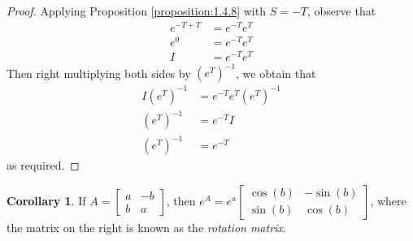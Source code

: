 \documentclass[11pt]{book}
\theoremstyle{definition}\newtheorem{definition}[subsection]{Definition}
\theoremstyle{definition}\newtheorem{example}[subsection]{Example}
\theoremstyle{definition}\newtheorem{notation}[subsection]{Notation}
\theoremstyle{definition}\newtheorem{remark}[subsection]{Remark}
\theoremstyle{theorem}\newtheorem{theorem}[subsection]{Theorem}
\theoremstyle{theorem}\newtheorem{lemma}[subsection]{Lemma}
\theoremstyle{theorem}\newtheorem{proposition}[subsection]{Proposition}
\theoremstyle{theorem}\newtheorem{corollary}[subsection]{Corollary}
\theoremstyle{theorem}\newtheorem{case}{Case}
\theoremstyle{remark}\newtheorem{subcase}{Subcase}[case]
\begin{document}
\begin{proof}
    Applying Proposition \ref{proposition:1.4.8} with $S = -T$, observe that
    \begin{align*}
        e^{-T + T} &= e^{-T}e^T \\
        e^{0} &= e^{-T}e^T \\
        I &= e^{-T}e^T
    \end{align*}
    Then right multiplying both sides by $(e^T)^{-1}$, we obtain that
    \begin{align*}
        I(e^T)^{-1} &= e^{-T}e^T(e^T)^{-1} \\
        (e^T)^{-1} &= e^{-T}I \\
        (e^T)^{-1} &= e^{-T}
    \end{align*}
    as required.
\end{proof}

\begin{corollary}\label{corollary:1.4.11}
    If $A = \begin{bmatrix} a & -b \\ b & a \end{bmatrix}$, then $e^A = e^a\begin{bmatrix} \cos(b) & -\sin(b) \\ \sin(b) & \cos(b) \end{bmatrix}$, where the matrix on the right is known as the \emph{rotation matrix}. 
\end{corollary}
\end{document}
